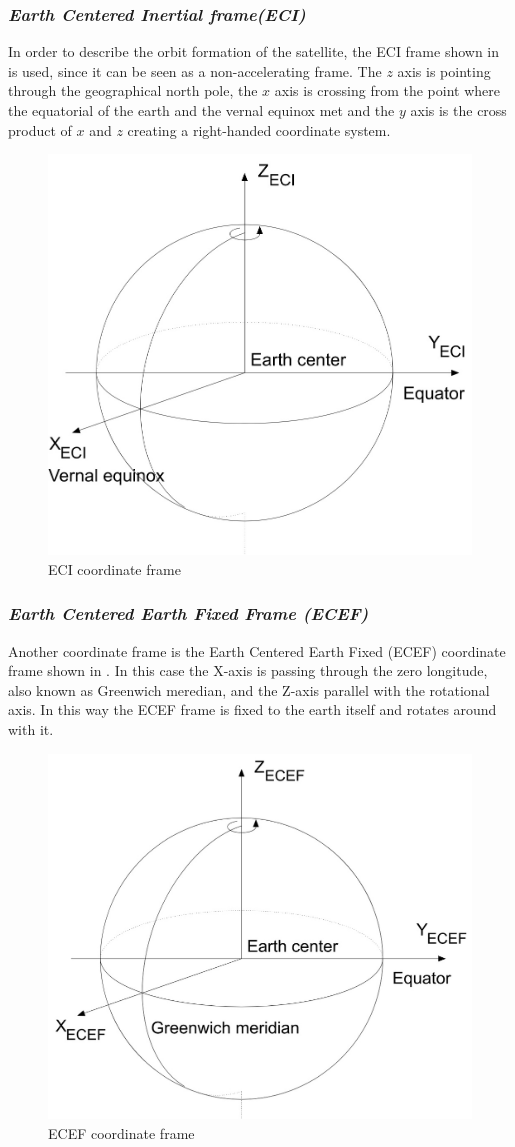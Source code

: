 \subsubsection{\textit{Earth Centered Inertial frame(ECI)}}
In order to describe the orbit formation of the satellite, the ECI frame shown in  is used, since it can be seen as a non-accelerating frame. The $z$ axis is pointing through the geographical north pole, the $x$ axis is crossing from the point where the equatorial of the earth and the vernal equinox met and the $y$ axis is the cross product of $x$ and $z$ creating a right-handed coordinate system. 
\begin{figure}[H]
	\centering
	\includegraphics[width=0.5\linewidth]{figures/ECI}
	\caption{ECI coordinate frame}
	\label{fig:ECI}
\end{figure}
\subsubsection{\textit{Earth Centered Earth Fixed Frame (ECEF)}}
Another coordinate frame is the Earth Centered Earth Fixed (ECEF) coordinate frame shown in . In this case the X-axis is passing through the zero longitude, also known as Greenwich meredian, and the Z-axis parallel with the rotational axis. In this way the ECEF frame is fixed to the earth itself and rotates around with it.
\begin{figure}[H]
	\centering
	\includegraphics[width=0.5\linewidth]{figures/ECEF}
	\caption{ECEF coordinate frame}
	\label{fig:ECEF}
\end{figure}

